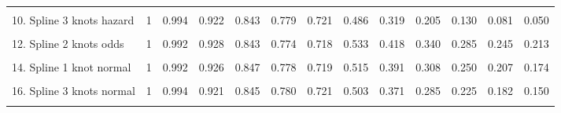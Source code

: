 \documentclass[]{article}
\begin{document}
\begin{table}
{\begin{tabular}[t]{lrrrrrrrrrrrr}
\cellcolor{gray!6}{9. Spline 2 knots hazard} & \cellcolor{gray!6}{1} & \cellcolor{gray!6}{0.992} & \cellcolor{gray!6}{0.928} & \cellcolor{gray!6}{0.843} & \cellcolor{gray!6}{0.774} & \cellcolor{gray!6}{0.719} & \cellcolor{gray!6}{0.523} & \cellcolor{gray!6}{0.384} & \cellcolor{gray!6}{0.283} & \cellcolor{gray!6}{0.210} & \cellcolor{gray!6}{0.156} & \cellcolor{gray!6}{0.116}\\
10. Spline 3 knots hazard & 1 & 0.994 & 0.922 & 0.843 & 0.779 & 0.721 & 0.486 & 0.319 & 0.205 & 0.130 & 0.081 & 0.050\\
\cellcolor{gray!6}{11. Spline 1 knot odds} & \cellcolor{gray!6}{1} & \cellcolor{gray!6}{0.992} & \cellcolor{gray!6}{0.927} & \cellcolor{gray!6}{0.843} & \cellcolor{gray!6}{0.774} & \cellcolor{gray!6}{0.718} & \cellcolor{gray!6}{0.532} & \cellcolor{gray!6}{0.415} & \cellcolor{gray!6}{0.338} & \cellcolor{gray!6}{0.283} & \cellcolor{gray!6}{0.242} & \cellcolor{gray!6}{0.211}\\
12. Spline 2 knots odds & 1 & 0.992 & 0.928 & 0.843 & 0.774 & 0.718 & 0.533 & 0.418 & 0.340 & 0.285 & 0.245 & 0.213\\
\cellcolor{gray!6}{13. Spline 3 knots odds} & \cellcolor{gray!6}{1} & \cellcolor{gray!6}{0.994} & \cellcolor{gray!6}{0.922} & \cellcolor{gray!6}{0.844} & \cellcolor{gray!6}{0.780} & \cellcolor{gray!6}{0.721} & \cellcolor{gray!6}{0.498} & \cellcolor{gray!6}{0.363} & \cellcolor{gray!6}{0.277} & \cellcolor{gray!6}{0.220} & \cellcolor{gray!6}{0.180} & \cellcolor{gray!6}{0.151}\\
14. Spline 1 knot normal & 1 & 0.992 & 0.926 & 0.847 & 0.778 & 0.719 & 0.515 & 0.391 & 0.308 & 0.250 & 0.207 & 0.174\\
\cellcolor{gray!6}{15. Spline 2 knots normal} & \cellcolor{gray!6}{1} & \cellcolor{gray!6}{0.992} & \cellcolor{gray!6}{0.929} & \cellcolor{gray!6}{0.842} & \cellcolor{gray!6}{0.773} & \cellcolor{gray!6}{0.718} & \cellcolor{gray!6}{0.538} & \cellcolor{gray!6}{0.426} & \cellcolor{gray!6}{0.350} & \cellcolor{gray!6}{0.295} & \cellcolor{gray!6}{0.253} & \cellcolor{gray!6}{0.220}\\
16. Spline 3 knots normal & 1 & 0.994 & 0.921 & 0.845 & 0.780 & 0.721 & 0.503 & 0.371 & 0.285 & 0.225 & 0.182 & 0.150\\
\cellcolor{gray!6}{17. Mixture cure Weibull} & \cellcolor{gray!6}{1} & \cellcolor{gray!6}{0.986} & \cellcolor{gray!6}{0.934} & \cellcolor{gray!6}{0.853} & \cellcolor{gray!6}{0.770} & \cellcolor{gray!6}{0.708} & \cellcolor{gray!6}{0.652} & \cellcolor{gray!6}{0.652} & \cellcolor{gray!6}{0.652} & \cellcolor{gray!6}{0.652} & \cellcolor{gray!6}{0.652} & \cellcolor{gray!6}{0.652}\\

\end{tabular}}
\end{table}
\end{document}
